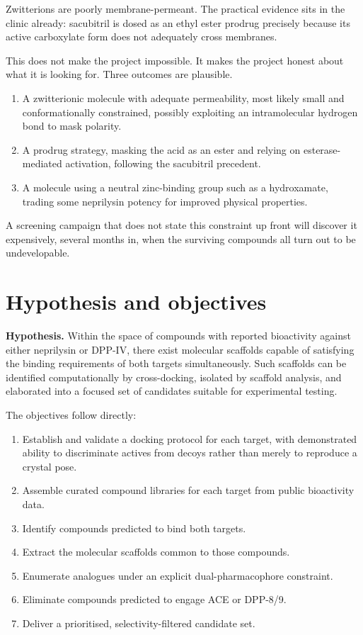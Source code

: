 \documentclass[11pt,a4paper]{article}
\begin{document}
Zwitterions are poorly membrane-permeant. The practical evidence sits in the
clinic already: sacubitril is dosed as an ethyl ester prodrug precisely because
its active carboxylate form does not adequately cross membranes.

This does not make the project impossible. It makes the project honest about
what it is looking for. Three outcomes are plausible.

\begin{enumerate}
\item A zwitterionic molecule with adequate permeability, most likely small and
conformationally constrained, possibly exploiting an intramolecular hydrogen
bond to mask polarity.
\item A prodrug strategy, masking the acid as an ester and relying on
esterase-mediated activation, following the sacubitril precedent.
\item A molecule using a neutral zinc-binding group such as a hydroxamate,
trading some neprilysin potency for improved physical properties.
\end{enumerate}

A screening campaign that does not state this constraint up front will discover
it expensively, several months in, when the surviving compounds all turn out to
be undevelopable.

\section{Hypothesis and objectives}

\begin{keybox}
\textbf{Hypothesis.} Within the space of compounds with reported bioactivity
against either neprilysin or DPP-IV, there exist molecular scaffolds capable of
satisfying the binding requirements of both targets simultaneously. Such
scaffolds can be identified computationally by cross-docking, isolated by
scaffold analysis, and elaborated into a focused set of candidates suitable for
experimental testing.
\end{keybox}

The objectives follow directly:

\begin{enumerate}
\item Establish and validate a docking protocol for each target, with
demonstrated ability to discriminate actives from decoys rather than merely to
reproduce a crystal pose.
\item Assemble curated compound libraries for each target from public
bioactivity data.
\item Identify compounds predicted to bind both targets.
\item Extract the molecular scaffolds common to those compounds.
\item Enumerate analogues under an explicit dual-pharmacophore constraint.
\item Eliminate compounds predicted to engage ACE or DPP-8/9.
\item Deliver a prioritised, selectivity-filtered candidate set.
\end{enumerate}
\end{document}
